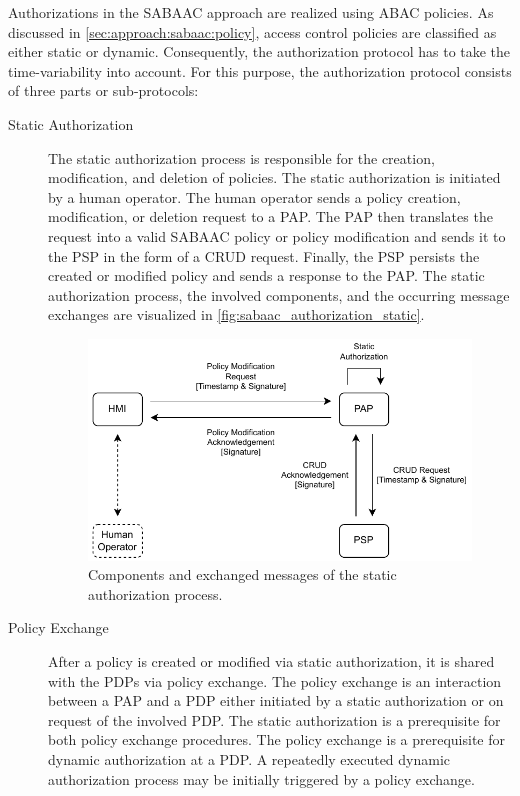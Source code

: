 Authorizations in the SABAAC approach are realized using ABAC policies.
As discussed in \autoref{sec:approach:sabaac:policy}, access control policies are classified as either static or dynamic.
Consequently, the authorization protocol has to take the time-variability into account.
For this purpose, the authorization protocol consists of three parts or sub-protocols:
\begin{description}
    \item[Static Authorization] The static authorization process is responsible for the creation, modification, and deletion of policies.
    The static authorization is initiated by a human operator.
    The human operator sends a policy creation, modification, or deletion request to a PAP.
    The PAP then translates the request into a valid SABAAC policy or policy modification and sends it to the PSP in the form of a CRUD request.
    Finally, the PSP persists the created or modified policy and sends a response to the PAP.
    The static authorization process, the involved components, and the occurring message exchanges are visualized in \autoref{fig:sabaac_authorization_static}.
    \begin{figure}
        \centering
        \includegraphics[width=0.9\linewidth]{figures/SABAAC_protocols_authorization_static.drawio.pdf}
        \caption{Components and exchanged messages of the static authorization process.
        }
        \label{fig:sabaac_authorization_static}
    \end{figure}
    \item[Policy Exchange] After a policy is created or modified via static authorization, it is shared with the PDPs via policy exchange.
    The policy exchange is an interaction between a PAP and a PDP either initiated by a static authorization or on request of the involved PDP.
    The static authorization is a prerequisite for both policy exchange procedures.
    The policy exchange is a prerequisite for dynamic authorization at a PDP.
    A repeatedly executed dynamic authorization process may be initially triggered by a policy exchange.


\end{description}
